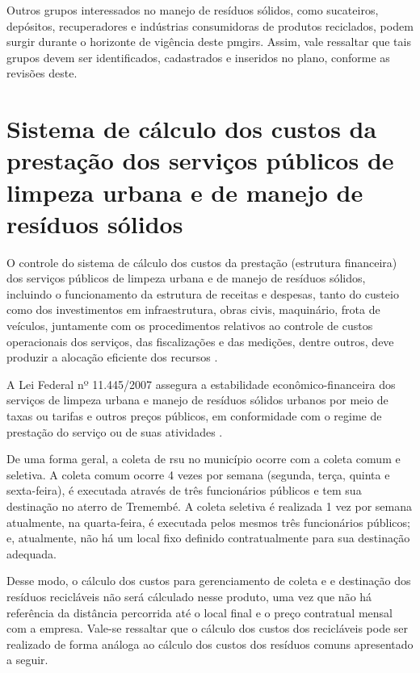 Outros grupos interessados no manejo de resíduos sólidos, como sucateiros, depósitos, recuperadores e indústrias consumidoras de produtos reciclados, podem surgir durante o horizonte de vigência deste \gls{pmgirs}. Assim, vale ressaltar que tais grupos devem ser identificados, cadastrados e inseridos no plano, conforme as revisões deste.


\FloatBarrier


\newpage
\section{Sistema de cálculo dos custos da prestação dos serviços públicos de limpeza urbana e de manejo de resíduos sólidos}
\label{sec:calculo_custo}

O controle do sistema de cálculo dos custos da prestação (estrutura financeira) dos serviços públicos de limpeza urbana e de manejo de resíduos sólidos, incluindo o funcionamento da estrutura de receitas e despesas, tanto do custeio como dos investimentos em infraestrutura, obras civis, maquinário, frota de veículos, juntamente com os procedimentos relativos ao controle de custos operacionais dos serviços, das fiscalizações e das medições, dentre outros, deve produzir a alocação eficiente dos recursos \cite{agevap_manual_2019}.

A Lei Federal nº 11.445/2007 assegura a estabilidade econômico-financeira dos serviços de limpeza urbana e manejo de resíduos sólidos urbanos por meio de taxas ou tarifas e outros preços públicos, em conformidade com o regime de prestação do serviço ou de suas atividades \cite{agevap_manual_2019}.

De uma forma geral, a coleta de \gls{rsu} no município ocorre com a coleta comum e seletiva. A coleta comum ocorre 4 vezes por semana (segunda, terça, quinta e sexta-feira), é executada através de três funcionários públicos e tem sua destinação no aterro de Tremembé. A coleta seletiva é realizada 1 vez por semana atualmente, na quarta-feira, é executada pelos mesmos três funcionários públicos; e, atualmente, não há um local fixo definido contratualmente para sua destinação adequada. 

Desse modo, o cálculo dos custos para gerenciamento de coleta e e destinação dos resíduos recicláveis não será cálculado nesse produto, uma vez que não há referência da distância percorrida até o local final e o preço contratual mensal com a empresa. Vale-se ressaltar que o cálculo dos custos dos recicláveis pode ser realizado de forma análoga ao cálculo dos custos dos resíduos comuns apresentado a seguir.

